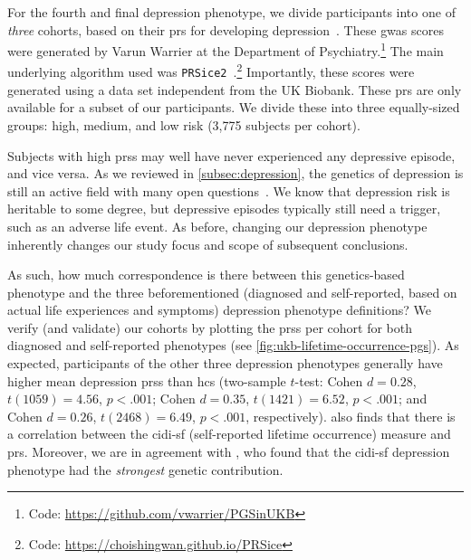 For the fourth and final depression phenotype, we divide participants into one of \emph{three} cohorts, based on their \gls{prs} for developing depression~\parencite{Bycroft2018}.
These \gls{gwas} scores were generated by Varun Warrier at the Department of Psychiatry.\footnote{Code: \url{https://github.com/vwarrier/PGSinUKB}}
The main underlying algorithm used was \texttt{PRSice2}~\parencite{Choi2019}.\footnote{Code: \url{https://choishingwan.github.io/PRSice}}
Importantly, these scores were generated using a data set independent from the UK Biobank.
These \gls{prs} are only available for a subset of our participants.
We divide these into three equally-sized groups: high, medium, and low risk (3,775 subjects per cohort).

Subjects with high \glspl{prs} may well have never experienced any depressive episode, and vice versa.
As we reviewed in \cref{subsec:depression}, the genetics of depression is still an active field with many open questions~\parencite{Ormel2019}.
We know that depression risk is heritable to some degree, but depressive episodes typically still need a trigger, such as an adverse life event.
As before, changing our depression phenotype inherently changes our study focus and scope of subsequent conclusions.

As such, how much correspondence is there between this genetics-based phenotype and the three beforementioned (diagnosed and self-reported, based on actual life experiences and symptoms) depression phenotype definitions?
We verify (and validate) our cohorts by plotting the \glspl{prs} per cohort for both diagnosed and self-reported phenotypes (see \cref{fig:ukb-lifetime-occurrence-pgs}).
As expected, participants of the other three depression phenotypes generally have higher mean depression \glspl{prs} than \glspl{hc} (two-sample $t$-test: Cohen $d = 0.28$, $t(1059) = 4.56$, $p < .001$; Cohen $d = 0.35$, $t(1421) = 6.52$, $p < .001$; and Cohen $d = 0.26$, $t(2468) = 6.49$, $p < .001$, respectively).
\textcite{Glanville2021} also finds that there is a correlation between the \gls{cidi-sf} (self-reported lifetime occurrence) measure and \gls{prs}.
Moreover, we are in agreement with \textcite{Cai2020}, who found that the \gls{cidi-sf} depression phenotype had the \emph{strongest} genetic contribution.


